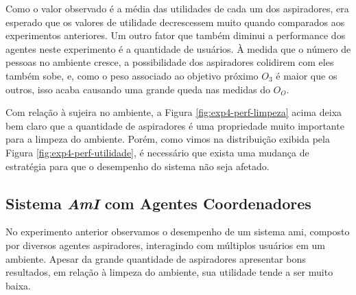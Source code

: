 Como o valor observado é a média das utilidades de cada um dos aspiradores, era esperado que os valores de utilidade decrescessem muito quando comparados aos experimentos anteriores. Um outro fator que também diminui a performance dos agentes neste experimento é a quantidade de usuários. À medida que o número de pessoas no ambiente cresce, a possibilidade dos aspiradores colidirem com eles também sobe, e, como o peso associado ao objetivo próximo $O_3$ é maior que os outros, isso acaba causando uma grande queda nas medidas do $O_O$.

\begin{figure}[h!]
    \centering
\end{figure}

Com relação à sujeira no ambiente, a Figura \ref{fig:exp4-perf-limpeza} acima deixa bem claro que a quantidade de aspiradores é uma propriedade muito importante para a limpeza do ambiente. Porém, como vimos na distribuição exibida pela Figura \ref{fig:exp4-perf-utilidade}, é necessário que exista uma mudança de estratégia para que o desempenho do sistema não seja afetado. 

\subsection{Sistema \textit{AmI} com Agentes Coordenadores}
\label{sec:exp-coord}

No experimento anterior observamos o desempenho de um sistema \acrshort{ami}, composto por diversos agentes aspiradores, interagindo com múltiplos usuários em um ambiente. Apesar da grande quantidade de aspiradores apresentar bons resultados, em relação à limpeza do ambiente, sua utilidade tende a ser muito baixa. 

